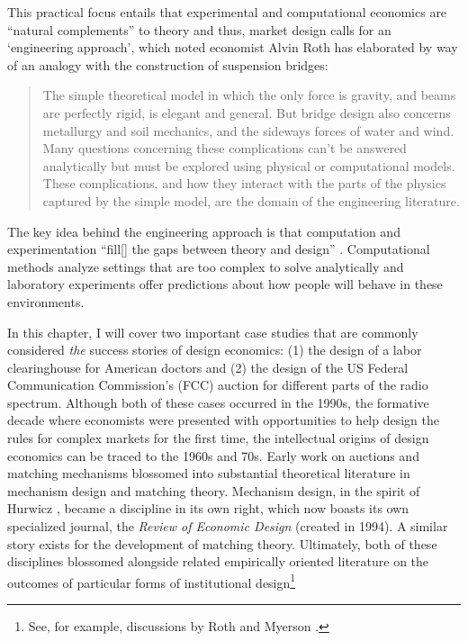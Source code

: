 This practical focus entails that experimental and computational economics are ``natural complements'' \autocite[p1342]{roth2002} to theory and thus, market design calls for an `engineering approach', which noted economist Alvin Roth \autocite*[p1342]{roth2002} has elaborated by way of an analogy with the construction of suspension bridges:
\begin{quote}
    The simple theoretical model in which the only force is gravity, and beams are perfectly rigid, is elegant and general. But bridge design also concerns metallurgy and soil mechanics, and the sideways forces of water and wind. Many questions concerning these complications can’t be answered analytically but must be explored using physical or computational models. These complications, and how they interact with the parts of the physics captured by the simple model, are the domain of the engineering literature.
\end{quote}
\noindent The key idea behind the engineering approach is that computation and experimentation ``fill[] the gaps between theory and design'' \autocite[p1374]{roth2002}. Computational methods analyze settings that are too complex to solve analytically and laboratory experiments offer predictions about how people will behave in these environments.


In this chapter, I will cover two important case studies that are commonly considered \textit{the} success stories of design economics: (1) the design of a labor clearinghouse for American doctors and (2) the design of the US Federal Communication Commission's (FCC) auction for different parts of the radio spectrum. Although both of these cases occurred in the 1990s, the formative decade where economists were presented with opportunities to help design the rules for complex markets for the first time, the intellectual origins of design economics can be traced to the 1960s and 70s. Early work on auctions \autocite{vickrey1961} and matching mechanisms \autocite{gale1962} blossomed into substantial theoretical literature in mechanism design and matching theory. Mechanism design, in the spirit of Hurwicz \autocite*{hurwicz1972}, became a discipline in its own right, which now boasts its own specialized journal, the \textit{Review of Economic Design} (created in 1994). A similar story exists for the development of matching theory. Ultimately, both of these disciplines blossomed alongside related empirically oriented literature on the outcomes of particular forms of institutional design\footnote{See, for example, discussions by Roth \autocite*{roth2002} and Myerson \autocite*{myerson2008}.}

